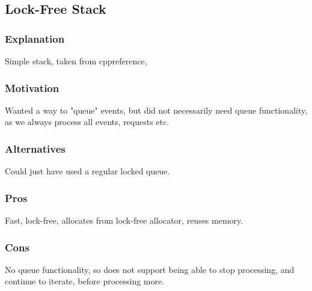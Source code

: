 \subsection{Lock-Free Stack}
\label{subsec:detailed_lock_free_stack}

\subsubsection{Explanation}
Simple stack, taken from cppreference, 

\subsubsection{Motivation}
Wanted a way to "queue" events, but did not necessarily need queue functionality,
as we always process all events, requests etc.

\subsubsection{Alternatives}
Could just have used a regular locked queue.

\subsubsection{Pros}
Fast, lock-free, allocates from lock-free allocator, reuses memory.

\subsubsection{Cons}
No queue functionality, so does not support being able to stop processing,
and continue to iterate, before processing more.
